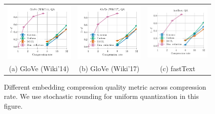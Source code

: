 \begin{figure}
\begin{tabular}{@{\hskip -0.0in}c@{\hskip -0.0in}c@{\hskip -0.0in}c@{\hskip -0.0in}}
		\includegraphics[width=.245\linewidth]{figures/glove400k_synthetics-large-dim_subspace-dist-normalized_vs_compression_linx_stoc.pdf} &
		\includegraphics[width=.245\linewidth]{figures/glove-wiki400k-am_synthetics-large-dim_subspace-dist-normalized_vs_compression_linx_stoc.pdf} &
		\includegraphics[width=.245\linewidth]{figures/fasttext1m_synthetics-large-dim_subspace-dist-normalized_vs_compression_linx_stoc.pdf}	\\
		(a) GloVe (Wiki'14) & \;\;\;\;(b) GloVe (Wiki'17)  & \;\;\;\;\;\;(c) fastText
	\end{tabular}
	\caption{Different embedding compression quality metric across compression rate. We use stochastic rounding for uniform quantization in this figure. }
	\label{fig:metric_vs_correlation_stoc}
\end{figure}



